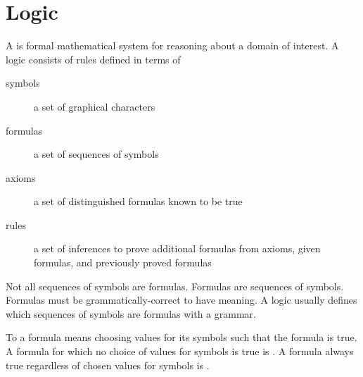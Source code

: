 \section{Logic}\label{sec:informal_logic}

\pn A  is formal mathematical system for reasoning about a domain of interest.  A logic consists of rules defined in terms of
\begin{description}
\item[symbols] a set of graphical characters
\item[formulas] a set of sequences of symbols
\item[axioms] a set of distinguished formulas known to be true 
\item[rules] a set of inferences to prove additional formulas from axioms, given formulas, and previously proved formulas
\end{description}
Not all sequences of symbols are formulas.  
Formulas are  sequences of symbols.  Formulas must be grammatically-correct to have meaning. A logic usually defines which sequences of symbols are formulas with a grammar.

To  a formula means choosing values for its symbols such that the formula is true.  A formula for which no choice of values for symbols is true is .  A formula always true regardless of chosen values for symbols is .

